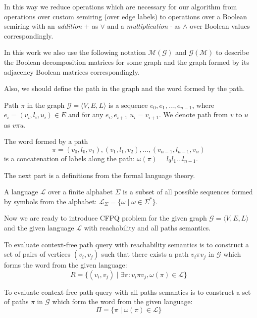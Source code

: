 In this way we reduce operations which are necessary for our algorithm from
operations over custom semiring (over edge labels) to operations over a Boolean 
semiring with an \textit{addition} $+$ as $\lor$ and a \textit{multiplication} 
$\cdot$ as $\land$ over Boolean values correspondingly.

In this work we also use the following notation $\mathcal{M}(\mathcal{G})$ and 
$\mathcal{G}(\mathcal{M})$ to describe the Boolean decomposition matrices for some graph 
and the graph formed by its adjacency Boolean matrices correspondingly.

Also, we should define the path in the graph and the word formed by the path.

\begin{definition}
Path $\pi$ in the graph $\mathcal{G} = \langle V,E,L \rangle$ is a sequence $e_0,e_1,\ldots,e_{n-1}$, where $e_i = (v_i,l_i,u_i) \in E$ and for any $e_i, e_{i+1}$ $u_i = v_{i+1}$. We denote path from $v$ to $u$ as $v\pi u$.   
\end{definition}

\begin{definition}
The word formed by a path $$\pi = (v_0,l_0,v_1),(v_1,l_1,v_2),\ldots,(v_{n-1},l_{n-1},v_n)$$ is a concatenation of labels along the path: $\omega(\pi) = l_0 l_1 \ldots l_{n-1}$.
\end{definition}

The next part is a definitions from the formal language theory.
\begin{definition}
A language $\mathcal{L}$ over a finite alphabet $\Sigma$ is a subset of all possible sequences formed by symbols from the alphabet: $\mathcal{L}_{\Sigma} = \{\omega \mid \omega \in \Sigma^*\}$.
\end{definition}

Now we are ready to introduce CFPQ problem for the given graph  $\mathcal{G} = \langle V,E,L \rangle$ and the given language $\mathcal{L}$ with reachability and all paths semantics.

\begin{definition}
To evaluate context-free path query with reachability semantics is to construct a set of pairs of vertices $(v_i,v_j)$ such that there exists a path $v_i \pi v_j$ in $\mathcal{G}$ which forms the word from the given language:
$$
R = \{(v_i,v_j) \mid \exists \pi: v_i \pi v_j, \omega(\pi) \in \mathcal{L} \}
$$
\end{definition}

\begin{definition}
To evaluate context-free path query with all paths semantics is to construct a set of paths $\pi$ in $\mathcal{G}$ which form the word from the given language:
$$
\Pi = \{ \pi \mid \omega(\pi) \in \mathcal{L}\}
$$
\end{definition}

